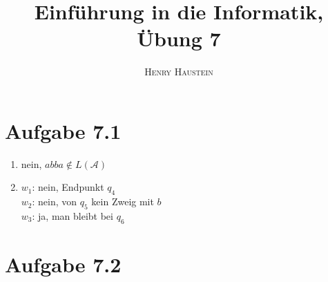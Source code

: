 \documentclass{article}
\title{\textbf{Einführung in die Informatik, Übung 7}}
\author{\textsc{Henry Haustein}}
\date{}
\begin{document}
	\maketitle
	
	\section*{Aufgabe 7.1}
	
	\begin{enumerate}[label=(\alph*)]
		\item nein, $abba\notin L(\mathcal{A})$
		\item $w_1$: nein, Endpunkt $q_4$ \\
		$w_2$: nein, von $q_5$ kein Zweig mit $b$ \\
		$w_3$: ja, man bleibt bei $q_6$
	\end{enumerate}
	
	\section*{Aufgabe 7.2}
	
\end{document}
